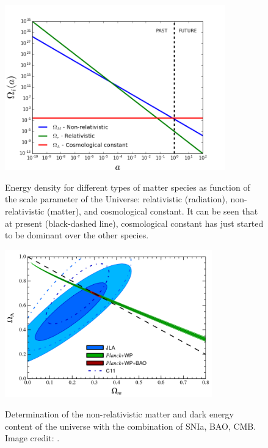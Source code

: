 \begin{figure}
\begin{center}
\includegraphics[width=0.85\textwidth]{./Pictures/rho_a.png}
\caption{Energy density for different types of matter species as function of the scale parameter of the Universe: relativistic (radiation), non-relativistic (matter), and cosmological constant. It can be seen that at present (black-dashed line), cosmological constant has just started to be dominant over the other species.}
\label{fig:rho_de}
\vspace*{0.2cm}
\includegraphics[width=0.8\textwidth]{./Pictures/om_ol.png}
\caption{Determination of the non-relativistic matter and dark energy content of the universe with the combination of SNIa, BAO, CMB. Image credit: \cite{2014A&A...568A..22B}.}
\label{fig:om_ol}
\end{center}
\end{figure}
\newline

